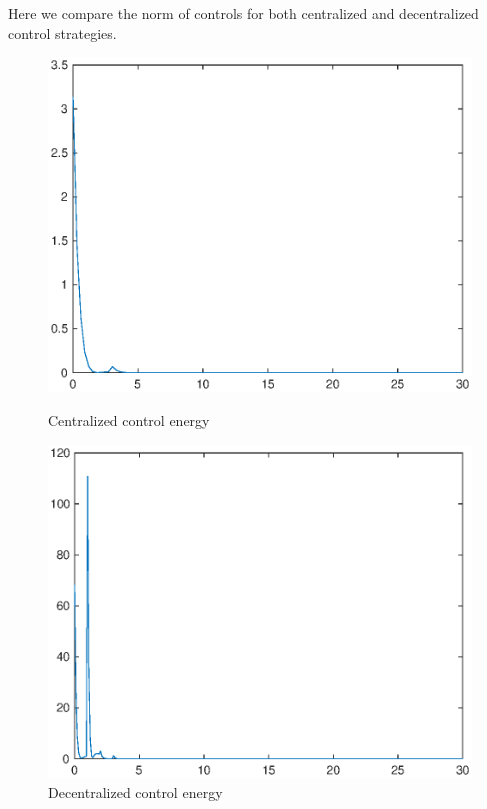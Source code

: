 \documentclass[a4paper,10pt, english]{article}
\begin{document}
Here we compare the norm of controls for both centralized and decentralized control strategies. 
\begin{figure}[ht]
  \begin{minipage}[b]{0.5\textwidth}
    \includegraphics[width=\textwidth]{figures/a5_C_c.eps}
    \caption{Centralized control energy}
    \label{cc}
  \end{minipage}
  \hfill
  \begin{minipage}[b]{0.5\textwidth}
    \includegraphics[width=\textwidth]{figures/a5_D_c.eps}
    \caption{Decentralized control energy}
    \label{dc}
  \end{minipage}
\end{figure}
\end{document}
